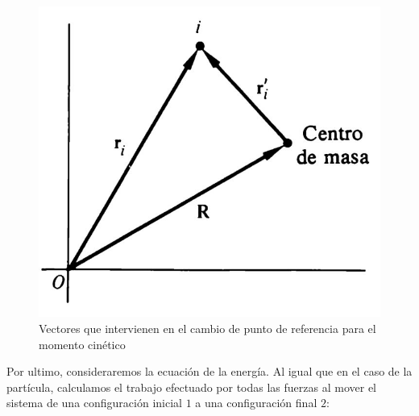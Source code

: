 \documentclass[../main]{subfiles}
\begin{document}
    \begin{figure}
        \centering
        \includegraphics[scale=0.4]{images/cm.JPG}
        \caption{Vectores que intervienen en el cambio de punto de referencia para el momento cinético}
        \label{fig:fig1}
    \end{figure}
    \vspace{0.2cm}

Por ultimo, consideraremos la ecuación de la energía. Al igual que en el caso de la partícula, calculamos el trabajo efectuado por todas las fuerzas al mover el sistema de una configuración inicial $1$ a una configuración final $2$:
    
\end{document}
